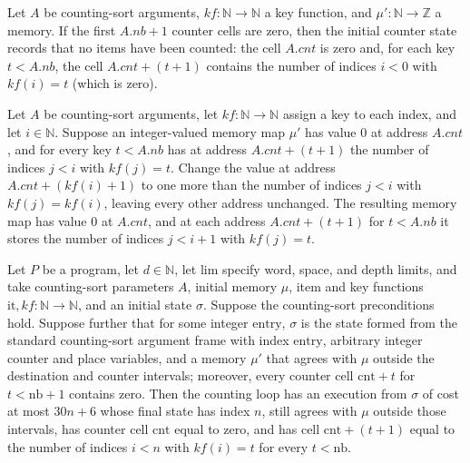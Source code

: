 \begin{theorem}
\label{Light.CsCounted.start}
\leanok
{}
Let $A$ be counting-sort arguments, $kf:\mathbb{N}\to\mathbb{N}$ a key function, and
$\mu\prime:\mathbb{N}\to\mathbb{Z}$ a memory. If the first $A.nb+1$ counter cells
are zero, then the initial counter state records that no items have been counted: the
cell $A.cnt$ is zero and, for each key $t<A.nb$, the cell $A.cnt+(t+1)$ contains the
number of indices $i<0$ with $kf(i)=t$ (which is zero).
\end{theorem}

\begin{theorem}
\label{Light.CsCounted.succ}
\leanok
{}
Let $A$ be counting-sort arguments, let $kf\colon\mathbb{N}\to\mathbb{N}$ assign a key
to each index, and let $i\in\mathbb{N}$. Suppose an integer-valued memory map $\mu'$ has
value $0$ at address $A.cnt$, and for every key $t<A.nb$ has at address $A.cnt+(t+1)$
the number of indices $j<i$ with $kf(j)=t$. Change the value at address
$A.cnt+(kf(i)+1)$ to one more than the number of indices $j<i$ with $kf(j)=kf(i)$,
leaving every other address unchanged. The resulting memory map has value $0$ at
$A.cnt$, and at each address $A.cnt+(t+1)$ for $t<A.nb$ it stores the number of indices
$j<i+1$ with $kf(j)=t$.
\end{theorem}

\begin{theorem}
\label{Light.csCount_ends}
\leanok
{}
Let $P$ be a program, let $d\in\mathbb{N}$, let $\mathrm{lim}$ specify word, space, and
depth limits, and take counting-sort parameters $A$, initial memory $\mu$, item and key
functions $\mathrm{it},kf:\mathbb{N}\to\mathbb{N}$, and an initial state $\sigma$.
Suppose the counting-sort preconditions hold. Suppose further that for some integer
$\mathrm{entry}$, $\sigma$ is the state formed from the standard counting-sort argument
frame with index $\mathrm{entry}$, arbitrary integer counter and place variables, and a
memory $\mu'$ that agrees with $\mu$ outside the destination and counter intervals;
moreover, every counter cell $\mathrm{cnt}+t$ for $t<\mathrm{nb}+1$ contains zero. Then
the counting loop has an execution from $\sigma$ of cost at most $30n+6$ whose final
state has index $n$, still agrees with $\mu$ outside those intervals, has counter cell
$\mathrm{cnt}$ equal to zero, and has cell $\mathrm{cnt}+(t+1)$ equal to the number of
indices $i<n$ with $kf(i)=t$ for every $t<\mathrm{nb}$.
\end{theorem}

